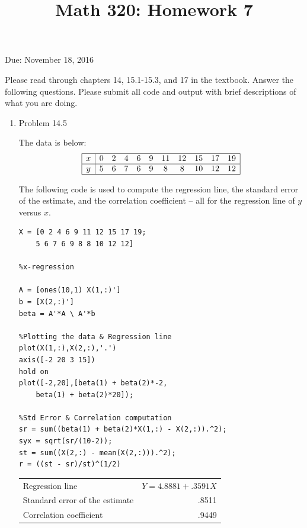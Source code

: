 \documentclass[12pt]{amsart}
\begin{document}
\title{Math 320: Homework 7}
Due: November 18, 2016
\maketitle

Please read through chapters 14, 15.1-15.3, and 17 in the textbook.
Answer the following questions. Please submit all code
and output with brief descriptions of what you are doing.

\vspace{5mm}

\begin{enumerate}

\item Problem 14.5

The data is below:
\[
\begin{array}{|c|cccccccccc|} \hline
x & 0 & 2 & 4 & 6 & 9 & 11 & 12 & 15 & 17 & 19 \\ \hline
y & 5 & 6 & 7 & 6 & 9 & 8 & 8 & 10 & 12 & 12 \\ \hline
\end{array}
\]

The following code is used to compute the regression line,
the standard error of the estimate, and the correlation coefficient
-- all for the regression line of $y$ versus $x$.

\begin{verbatim}
X = [0 2 4 6 9 11 12 15 17 19;
    5 6 7 6 9 8 8 10 12 12]

%x-regression

A = [ones(10,1) X(1,:)']
b = [X(2,:)']
beta = A'*A \ A'*b

%Plotting the data & Regression line
plot(X(1,:),X(2,:),'.')
axis([-2 20 3 15])
hold on 
plot([-2,20],[beta(1) + beta(2)*-2,
    beta(1) + beta(2)*20]);

%Std Error & Correlation computation
sr = sum((beta(1) + beta(2)*X(1,:) - X(2,:)).^2);
syx = sqrt(sr/(10-2));
st = sum((X(2,:) - mean(X(2,:))).^2);
r = ((st - sr)/st)^(1/2)
\end{verbatim}

\vspace{5mm}

\begin{tabular}{lr}
Regression line & $Y = 4.8881 + .3591 X$ \\
Standard error of the estimate & .8511 \\
Correlation coefficient & .9449 \\
\end{tabular}


\end{enumerate}
\end{document}
